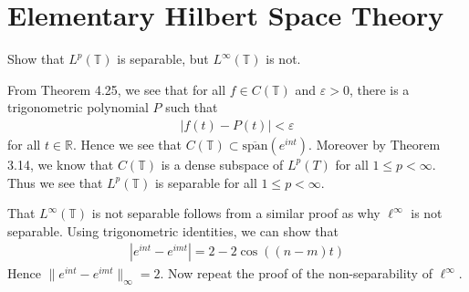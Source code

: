 \setcounter{chapter}{3}
\chapter{Elementary Hilbert Space Theory}

\setcounter{exercise}{2}
\setcounter{solution}{2}
\begin{exercise}
  Show that $L^p(\mathbb{T})$ is separable, but $L^{\infty}(
  \mathbb{T})$ is not.
\end{exercise}
\begin{solution}
  From Theorem 4.25, we see that for all $f \in C(\mathbb{T})$ and
  $\varepsilon >0$, there is a trigonometric polynomial $P$ such that
  \begin{align*}
    |f(t) - P(t)| < \varepsilon
  \end{align*}
  for all $t \in \mathbb{R}$. Hence we see that $C(\mathbb{T})
  \subset  \overline{\textrm{span}}(e^{int})$. Moreover by Theorem
  3.14, we know that $C(\mathbb{T})$ is a dense subspace of $L^{p}(T)$ for all
  $1 \le p < \infty$. Thus we see that $L^{p}(\mathbb{T})$ is
  separable for all $1 \le p < \infty$.

  That $L^{\infty}( \mathbb{T})$ is not separable follows from a
  similar proof as why $\ell^{\infty}$ is not separable. Using
  trigonometric identities, we can show that
  \begin{align*}
    |e^{int} - e^{imt}| = 2 - 2 \cos((n-m)t)
  \end{align*}
  Hence $\|e^{int} - e^{imt}\|_\infty = 2$. Now repeat the proof of
  the non-separability of $\ell^{\infty}$.
\end{solution}

